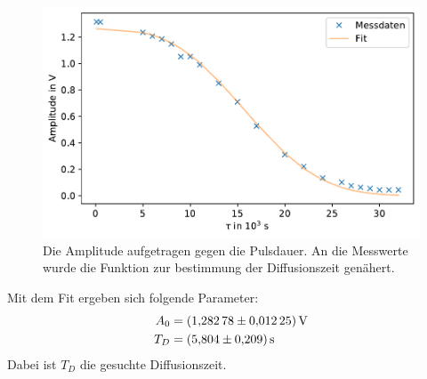 \begin{figure}[ht]
    \center
    \includegraphics[scale = 0.75]{plots/df2_2.pdf}
    \caption{Die Amplitude aufgetragen gegen die Pulsdauer. An die Messwerte wurde die Funktion zur bestimmung der Diffusionszeit genähert.}
    \label{fig:df2_2}
\end{figure}
Mit dem Fit ergeben sich folgende Parameter:
\begin{align*}
    A_0 &= \SI{1.28278 +- 0.01225}{\volt}\\
    T_D &= \SI{5.804 +- 0.209}{\second}
\end{align*}
Dabei ist $T_D$ die gesuchte Diffusionszeit.

